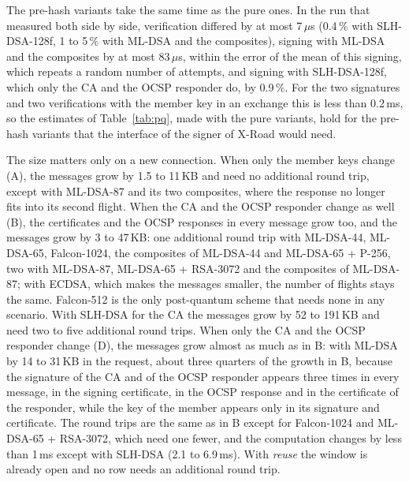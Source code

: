 \documentclass[conference,a4paper]{IEEEtran}
\newcommand{\newtext}[1]{{\color{blue}#1}}
\begin{document}
{\newtext{The pre-hash variants take the same time as the pure ones. In the run that measured both
side by side, verification differed by at most 7\,$\mu$s (0.4\,\% with SLH-DSA-128f, 1 to 5\,\% with
ML-DSA and the composites), signing with ML-DSA and the composites by at most 83\,$\mu$s, within the
error of the mean of this signing, which repeats a random number of attempts, and signing with
SLH-DSA-128f, which only the CA and the OCSP responder do, by 0.9\,\%. For the two
signatures and two verifications with the member key in an exchange this is less than 0.2\,ms, so the
estimates of Table~\ref{tab:pq}, made with the pure variants, hold for the pre-hash variants that the
interface of the signer of X-Road would need.}

The size matters only on a new connection. When only the member keys change (A), the messages grow by
1.5 to 11\,KB and need no additional round trip, except with ML-DSA-87 \newtext{and its two composites}, where the response no longer
fits into its second flight. When the CA and the OCSP responder change as well (B), the certificates
and the OCSP responses in every message grow too, and the messages grow by 3 to 47\,KB: one additional
round trip with ML-DSA-44, ML-DSA-65, Falcon-1024\newtext{,} the composites of ML-DSA-44 \newtext{and
ML-DSA-65 + P-256}, two with ML-DSA-87\newtext{, ML-DSA-65 + RSA-3072} and the composites of
ML-DSA-87\newtext{; with ECDSA, which makes the messages smaller, the number of flights stays the same}. Falcon-512 is the only post-quantum scheme that needs none in \newtext{any} scenario. With SLH-DSA
for the CA the messages grow by 52 to 191\,KB and need two to five additional round trips.
\newtext{When only the CA and the OCSP responder change (D), the messages grow
almost as much as in B: with ML-DSA by 14 to 31\,KB in the request, about three quarters of the
growth in B, because the signature of the CA and of the OCSP responder appears three times in every
message, in the signing certificate, in the OCSP response and in the certificate of the responder,
while the key of the member appears only in its signature and certificate. The round trips are the
same as in B except for Falcon-1024 and \newtext{ML-DSA-65 + RSA-3072}, which need one fewer, and the
computation changes by less than 1\,ms except with SLH-DSA (2.1 to 6.9\,ms).} With
\emph{reuse} the window is already open and no row needs an additional round trip.

}
\end{document}
